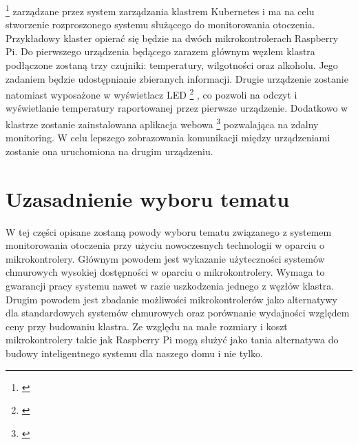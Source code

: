 \documentclass[12pt]{report}
\let\Oldsection\section
\renewcommand{\section}{\FloatBarrier\Oldsection}
\begin{document}
	\footnote{\cite{docker}}
zarządzane przez system zarządzania klastrem Kubernetes i ma na celu stworzenie rozproszonego systemu służącego do monitorowania otoczenia. Przykładowy klaster opierać się będzie na dwóch mikrokontrolerach Raspberry Pi. Do pierwszego urządzenia będącego zarazem głównym węzłem klastra podłączone zostaną trzy czujniki: temperatury, wilgotności oraz alkoholu. Jego zadaniem będzie udostępnianie zbieranych informacji. Drugie urządzenie zostanie natomiast wyposażone w wyświetlacz LED
	\footnote{\cite{led}}
, co pozwoli na odczyt i wyświetlanie temperatury raportowanej przez pierwsze urządzenie. Dodatkowo w klastrze zostanie zainstalowana aplikacja webowa
\footnote{\cite{webapp}}
pozwalająca na zdalny monitoring. W celu lepszego zobrazowania komunikacji między urządzeniami zostanie ona uruchomiona na drugim urządzeniu.

\section{Uzasadnienie wyboru tematu}
W tej części opisane zostaną powody wyboru tematu związanego z systemem monitorowania otoczenia przy użyciu nowoczesnych technologii w oparciu o mikrokontrolery. Głównym powodem jest wykazanie użyteczności systemów chmurowych wysokiej dostępności w oparciu o mikrokontrolery. Wymaga to gwarancji pracy systemu nawet w razie uszkodzenia jednego z węzłów klastra. Drugim powodem jest zbadanie możliwości mikrokontrolerów jako alternatywy dla standardowych systemów chmurowych oraz porównanie wydajności względem ceny przy budowaniu klastra. Ze względu na małe rozmiary i koszt mikrokontrolery takie jak Raspberry Pi mogą służyć jako tania alternatywa do budowy inteligentnego systemu dla naszego domu i nie tylko.
\end{document}
